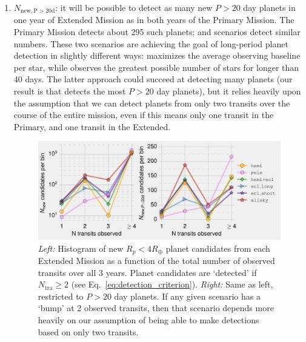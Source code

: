 \begin{enumerate}
	\item $N_\mathrm{new,P>20d}$: it will be possible to detect as many new 
	$P>20$ day planets in one year of \tesss Extended Mission as in both years 
	of the Primary Mission.
	The Primary Mission detects about 295 such planets; \hemis\:and 
	\npole\:scenarios detect similar numbers.
	These two scenarios are achieving the goal of long-period planet detection 
	in slightly different ways: %
	\npole\:maximizes the average observing baseline per star, while 
	\hemis\:observes the greatest possible number of stars for longer than 40 
	days.
	The latter approach could succeed at detecting many planets (our result is 
	that \hemis\:detects the most $P>20$ day planets), but it relies heavily 
	upon the assumption that we can detect planets from only two transits over 
	the course of the entire mission, even if this means only one transit in 
	the Primary, and one transit in the Extended.
	\begin{figure}[!t]
		\centering
		\includegraphics{figures/Ntra_histogram_nogap.pdf}
		\caption{ \textit{Left:} Histogram of new $R_p<4R_\oplus$ planet 
			candidates from each Extended Mission as a function of the 
			total number of 
			observed transits over all 3 years.
			Planet candidates are `detected' if $N_\mathrm{tra}\geq2$ 
			(see Eq.~\protect\ref{eq:detection_criterion}).
			\textit{Right:} Same as left, restricted to $P>20$ day planets.
			If any given scenario has a `bump' at 2 observed transits, then 
			that scenario depends more heavily on our assumption of being 
			able to make detections based on only two transits.
}
\end{figure}
\end{enumerate}
